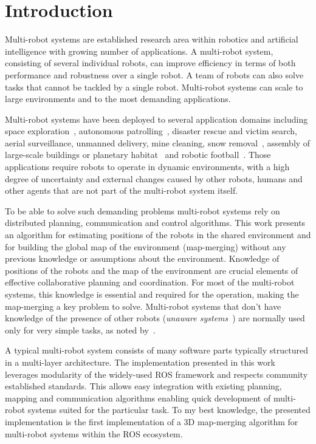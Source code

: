 \chapter*{Introduction}

Multi-robot systems are established research area within robotics and artificial intelligence with growing number of applications. A multi-robot system, consisting of several individual robots, can improve efficiency in terms of both performance and robustness over a single robot. A team of robots can also solve tasks that cannot be tackled by a single robot. Multi-robot systems can scale to large environments and to the most demanding applications.

Multi-robot systems have been deployed to several application domains including space exploration~\citep{goldberg2002distributedspace,huntsberger2003campout}, autonomous patrolling~\citep{parker2003parolling100}, disaster rescue and victim search, aerial surveillance, unmanned delivery, mine cleaning, snow removal~\citep{choset2001coverage}, assembly of large-scale buildings or planetary habitat~\citep{goldberg2002distributedspace} and robotic football~\citep{asada1999robocup}. Those applications require robots to operate in dynamic environments, with a high degree of uncertainty and external changes caused by other robots, humans and other agents that are not part of the multi-robot system itself.

To be able to solve such demanding problems multi-robot systems rely on distributed planning, communication and control algorithms. This work presents an algorithm for estimating positions of the robots in the shared environment and for building the global map of the environment (map-merging) without any previous knowledge or assumptions about the environment. Knowledge of positions of the robots and the map of the environment are crucial elements of effective collaborative planning and coordination. For most of the multi-robot systems, this knowledge is essential and required for the operation, making the map-merging a key problem to solve. Multi-robot systems that don't have knowledge of the presence of other robots (\textit{unaware systems}~\citep{farinelli2004multirobot}) are normally used only for very simple tasks, as noted by~\citet{farinelli2004multirobot}.

A typical multi-robot system consists of many software parts typically structured in a multi-layer architecture. The implementation presented in this work leverages modularity of the widely-used \gls{ROS} framework and respects community established standards. This allows easy integration with existing planning, mapping and communication algorithms enabling quick development of multi-robot systems suited for the particular task. To my best knowledge, the presented implementation is the first implementation of a \gls{3D} map-merging algorithm for multi-robot systems within the \gls{ROS} ecosystem.

